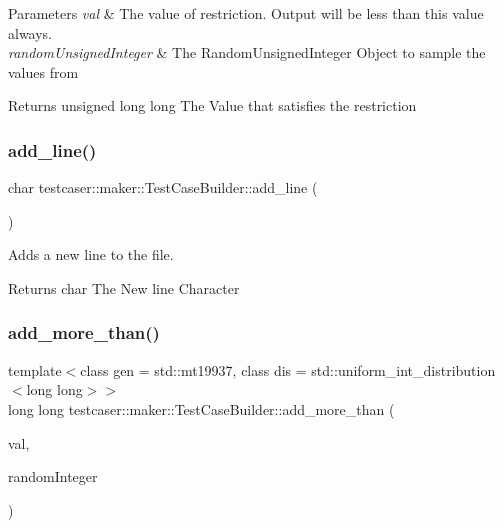\begin{DoxyParams}{Parameters}
{\em val} & The value of restriction. Output will be less than this value always. \\
\hline
{\em random\+Unsigned\+Integer} & The Random\+Unsigned\+Integer Object to sample the values from \\
\hline
\end{DoxyParams}
\begin{DoxyReturn}{Returns}
unsigned long long The Value that satisfies the restriction 
\end{DoxyReturn}
\mbox{\label{classtestcaser_1_1maker_1_1TestCaseBuilder_abdb7ac9e7f1036c4b84adf48bb019cfa}} 
\subsubsection{\texorpdfstring{add\_line()}{add\_line()}}
{\footnotesize\ttfamily char testcaser\+::maker\+::\+Test\+Case\+Builder\+::add\+\_\+line (\begin{DoxyParamCaption}{ }\end{DoxyParamCaption})\hspace{0.3cm}{\ttfamily [inline]}}



Adds a new line to the file. 

\begin{DoxyReturn}{Returns}
char The New line Character 
\end{DoxyReturn}
\mbox{\label{classtestcaser_1_1maker_1_1TestCaseBuilder_ac6cfa5b3269b899b19fc5b4d2e97b4aa}} 
\subsubsection{\texorpdfstring{add\_more\_than()}{add\_more\_than()}\hspace{0.1cm}{\footnotesize\ttfamily [1/2]}}
{\footnotesize\ttfamily template$<$class gen  = std\+::mt19937, class dis  = std\+::uniform\+\_\+int\+\_\+distribution$<$long long$>$$>$ \\
long long testcaser\+::maker\+::\+Test\+Case\+Builder\+::add\+\_\+more\+\_\+than (\begin{DoxyParamCaption}\item[{long long}]{val,  }\item[{\mbox{\hyperlink{classtestcaser_1_1maker_1_1types_1_1RandomInteger}{types\+::\+Random\+Integer}}$<$ gen, dis $>$ \&}]{random\+Integer }\end{DoxyParamCaption})\hspace{0.3cm}{\ttfamily [inline]}}



